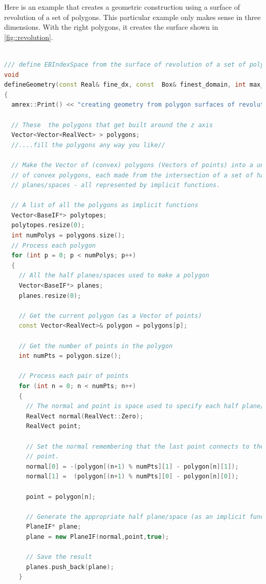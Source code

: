 Here is an example that creates a geometric construction using a
surface of revolution of a set of polygons.   This particular example
only makes sense in three dimensions.   With the right polygons, it
creates the surface shown in \ref{fig::revolution}.

\begin{lstlisting}[language=cpp]

/// define EBIndexSpace from the surface of revolution of a set of polygons
void
defineGeometry(const Real& fine_dx, const  Box& finest_domain, int max_grid_size)
{
  amrex::Print() << "creating geometry from polygon surfaces of revolution" << endl;

  // These  the polygons that get built around the z axis
  Vector<Vector<RealVect> > polygons;
  //....fill the polygons any way you like//

  // Make the Vector of (convex) polygons (Vectors of points) into a union
  // of convex polygons, each made from the intersection of a set of half
  // planes/spaces - all represented by implicit functions.

  // A list of all the polygons as implicit functions
  Vector<BaseIF*> polytopes;
  polytopes.resize(0);
  int numPolys = polygons.size();
  // Process each polygon
  for (int p = 0; p < numPolys; p++)
  {
    // All the half planes/spaces used to make a polygon
    Vector<BaseIF*> planes;
    planes.resize(0);

    // Get the current polygon (as a Vector of points)
    const Vector<RealVect>& polygon = polygons[p];

    // Get the number of points in the polygon
    int numPts = polygon.size();

    // Process each pair of points
    for (int n = 0; n < numPts; n++)
    {
      // The normal and point is space used to specify each half plane/space
      RealVect normal(RealVect::Zero);
      RealVect point;

      // Set the normal remembering that the last point connects to the first
      // point.
      normal[0] = -(polygon[(n+1) % numPts][1] - polygon[n][1]);
      normal[1] =  (polygon[(n+1) % numPts][0] - polygon[n][0]);

      point = polygon[n];

      // Generate the appropriate half plane/space (as an implicit function)
      PlaneIF* plane;
      plane = new PlaneIF(normal,point,true);

      // Save the result
      planes.push_back(plane);
    }


\end{lstlisting}
